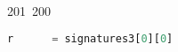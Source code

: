 201~200~\documentclass{article}
\begin{document}
\begin{lstlisting}[language=Python, caption = Cracking private key Chall 3]
	                                                                        	                                                                    	                                	                    	                    	                        	                        	                    	                                                                	                	                                                                    	                    							                                                                                                                                                                                                    		                                                                                                                        				    			                                r      = signatures3[0][0]
	                                                                        	                                                                    	                                	                    	                    	                        	                        	                    	                                                                	                	                                                                    	                    							                                                                                                                                                                                                    		                                                                                                                        				    			                                    s      = signatures3[0][1]

	                                                                        	                                                                    	                                	                    	                    	                        	                        	                    	                                                                	                	                                                                    	                    							                                                                                                                                                                                                    		                                                                                                                        				    			                                        sprime = signatures3[1][1]


\end{lstlisting}
\end{document}
